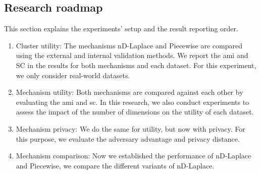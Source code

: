 \subsection{Research roadmap} \label{research-roadmap}
This section explains the experiments' setup and the result reporting order.
\begin{enumerate}
  \item Cluster utility: The mechanisms nD-Laplace and Piecewise are compared using the external and internal validation methods.
        We report the \gls{ami} and SC in the results for both mechanisms and each dataset.
        For this experiment, we only consider real-world datasets.
  \item Mechanism utility: Both mechanisms are compared against each other by evaluating the \gls{ami} and \gls{sc}.
        In this research, we also conduct experiments to assess the impact of the number of dimensions on the utility of each dataset.
  \item Mechanism privacy: We do the same for utility, but now with privacy.
        For this purpose, we evaluate the adversary advantage and privacy distance.
  \item Mechanism comparison: Now we established the performance of nD-Laplace and Piecewise, we compare the different variants of nD-Laplace.

\end{enumerate}
